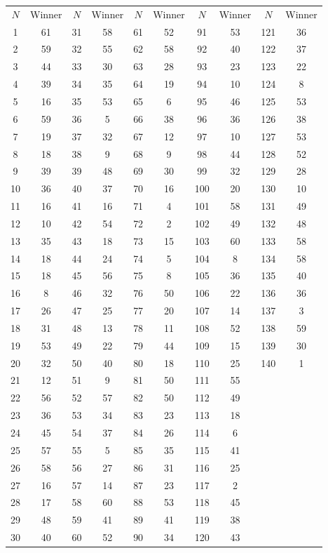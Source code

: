 \documentclass{article}
\begin{document}
\begin{center}
\begin{tabular*}{\textwidth}{@{\extracolsep{\fill}} cccccccccc}
$N$ & Winner & $N$ & Winner & $N$ & Winner & $N$ & Winner & $N$ & Winner \\
\cline{1-2} \cline{3-4} \cline{5-6} \cline{7-8} \cline{9-10}
1 & 61 & 31 & 58 & 61 & 52 & 91 & 53 & 121 & 36 \\
2 & 59 & 32 & 55 & 62 & 58 & 92 & 40 & 122 & 37 \\
3 & 44 & 33 & 30 & 63 & 28 & 93 & 23 & 123 & 22 \\
4 & 39 & 34 & 35 & 64 & 19 & 94 & 10 & 124 & 8 \\
5 & 16 & 35 & 53 & 65 & 6 & 95 & 46 & 125 & 53 \\
6 & 59 & 36 & 5 & 66 & 38 & 96 & 36 & 126 & 38 \\
7 & 19 & 37 & 32 & 67 & 12 & 97 & 10 & 127 & 53 \\
8 & 18 & 38 & 9 & 68 & 9 & 98 & 44 & 128 & 52 \\
9 & 39 & 39 & 48 & 69 & 30 & 99 & 32 & 129 & 28 \\
10 & 36 & 40 & 37 & 70 & 16 & 100 & 20 & 130 & 10 \\
11 & 16 & 41 & 16 & 71 & 4 & 101 & 58 & 131 & 49 \\
12 & 10 & 42 & 54 & 72 & 2 & 102 & 49 & 132 & 48 \\
13 & 35 & 43 & 18 & 73 & 15 & 103 & 60 & 133 & 58 \\
14 & 18 & 44 & 24 & 74 & 5 & 104 & 8 & 134 & 58 \\
15 & 18 & 45 & 56 & 75 & 8 & 105 & 36 & 135 & 40 \\
16 & 8 & 46 & 32 & 76 & 50 & 106 & 22 & 136 & 36 \\
17 & 26 & 47 & 25 & 77 & 20 & 107 & 14 & 137 & 3 \\
18 & 31 & 48 & 13 & 78 & 11 & 108 & 52 & 138 & 59 \\
19 & 53 & 49 & 22 & 79 & 44 & 109 & 15 & 139 & 30 \\
20 & 32 & 50 & 40 & 80 & 18 & 110 & 25 & 140 & 1 \\
21 & 12 & 51 & 9 & 81 & 50 & 111 & 55 &  &  \\
22 & 56 & 52 & 57 & 82 & 50 & 112 & 49 &  &  \\
23 & 36 & 53 & 34 & 83 & 23 & 113 & 18 &  &  \\
24 & 45 & 54 & 37 & 84 & 26 & 114 & 6 &  &  \\
25 & 57 & 55 & 5 & 85 & 35 & 115 & 41 &  &  \\
26 & 58 & 56 & 27 & 86 & 31 & 116 & 25 &  &  \\
27 & 16 & 57 & 14 & 87 & 23 & 117 & 2 &  &  \\
28 & 17 & 58 & 60 & 88 & 53 & 118 & 45 &  &  \\
29 & 48 & 59 & 41 & 89 & 41 & 119 & 38 &  &  \\
30 & 40 & 60 & 52 & 90 & 34 & 120 & 43 &  &  \\
\end{tabular*}
\end{center}
\end{document}
